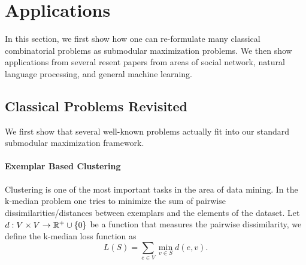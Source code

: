 \section{Applications}
\label{sec:applications}
In this section, we first show how one can re-formulate many classical combinatorial problems as submodular maximization problems. We then show applications  from several resent papers from areas of social network, natural language processing, and general machine learning. 







\subsection{Classical Problems Revisited}
\label{sec:classical}
We first show that several well-known problems actually fit into our standard submodular maximization framework.

\paragraph{Exemplar Based Clustering}
Clustering is one of the most important tasks in the area of data mining. In the k-median problem \cite{KR09} one tries to minimize the sum of pairwise dissimilarities/distances between exemplars and the elements of the dataset. Let $d: V \times V \rightarrow \mathbb{R}^+\cup\{0\}$ be a function that measures the pairwise dissimilarity, we define the k-median loss function as
$$L(S) = \sum_{e\in V} \min_{v\in S} d(e, v).$$

